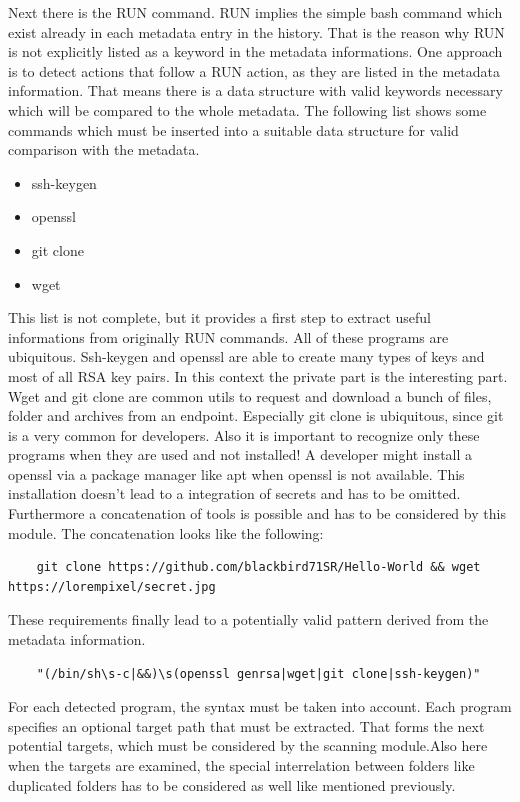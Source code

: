 Next there is the RUN command. RUN implies the simple bash command which exist already in each metadata entry in the history. That is the reason why RUN is not explicitly listed as a keyword in the metadata informations. 
One approach is to detect actions that follow a RUN action, as they are listed in the metadata information. That means there is a data structure with valid keywords necessary which will be compared to the whole metadata.
The following list shows some commands which must be inserted into a suitable data structure for valid comparison with the metadata.
\begin{itemize}
\item ssh-keygen
\item openssl
\item git clone
\item wget
\end{itemize}
This list is not complete, but it provides a first step to extract useful informations from originally RUN commands. All of these programs are ubiquitous.
Ssh-keygen and openssl are able to create many types of keys and most of all RSA key pairs. In this context the private part is the interesting part.
Wget and git clone are common utils to request and download a bunch of files, folder and archives from an endpoint. Especially git clone is ubiquitous, since git is a very common for developers.
Also it is important to recognize only these programs when they are used and not installed! A developer might install a openssl via a package manager like apt when openssl is not available.
This installation doesn't lead to a integration of secrets and has to be omitted.
Furthermore a concatenation of tools is possible and has to be considered by this module. The concatenation looks like the following:
\begin{lstlisting}
	git clone https://github.com/blackbird71SR/Hello-World && wget https://lorempixel/secret.jpg
\end{lstlisting}

These requirements finally lead to a potentially valid pattern derived from the metadata information.
\begin{lstlisting}
	"(/bin/sh\s-c|&&)\s(openssl genrsa|wget|git clone|ssh-keygen)"
\end{lstlisting}

For each detected program, the syntax must be taken into account. Each program specifies an optional target path that must be extracted. That forms the next potential targets, which must be considered by the scanning module.Also here when the targets are examined, the special interrelation between folders like duplicated folders has to be considered as well like mentioned previously.

